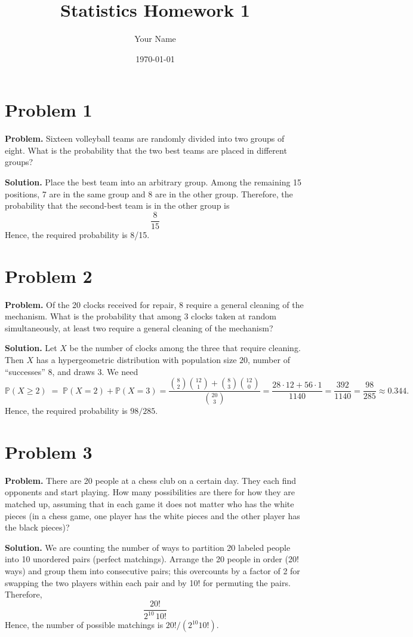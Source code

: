 \documentclass{article}
\title{Statistics Homework 1}
\author{Your Name}
\date{\today}
\begin{document}
\maketitle

\section{Problem 1}

\textbf{Problem.} Sixteen volleyball teams are randomly divided into two groups of eight. What is the probability that the two best teams are placed in different groups?

\textbf{Solution.} Place the best team into an arbitrary group. Among the remaining 15 positions, 7 are in the same group and 8 are in the other group. Therefore, the probability that the second-best team is in the other group is
\[
\frac{8}{15}
\]
Hence, the required probability is 8/15.
\section{Problem 2}

\textbf{Problem.} Of the 20 clocks received for repair, 8 require a general cleaning of the mechanism. What is the probability that among 3 clocks taken at random simultaneously, at least two require a general cleaning of the mechanism?

\textbf{Solution.} Let $X$ be the number of clocks among the three that require cleaning. Then $X$ has a hypergeometric distribution with population size $20$, number of ``successes'' $8$, and draws $3$. We need
\[
\mathbb{P}(X \ge 2) \;=\; \mathbb{P}(X=2) + \mathbb{P}(X=3)
= \frac{\binom{8}{2}\binom{12}{1} + \binom{8}{3}\binom{12}{0}}{\binom{20}{3}}
= \frac{28\cdot 12 + 56\cdot 1}{1140}
= \frac{392}{1140}
= \frac{98}{285}
\approx 0.344.
\]
Hence, the required probability is $98/285$.
\section{Problem 3}

\textbf{Problem.} There are 20 people at a chess club on a certain day. They each find opponents and start playing. How many possibilities are there for how they are matched up, assuming that in each game it does not matter who has the white pieces (in a chess game, one player has the white pieces and the other player has the black pieces)?

\textbf{Solution.} We are counting the number of ways to partition 20 labeled people into 10 unordered pairs (perfect matchings). Arrange the 20 people in order (20! ways) and group them into consecutive pairs; this overcounts by a factor of 2 for swapping the two players within each pair and by 10! for permuting the pairs. Therefore,
\[
\frac{20!}{2^{10}\,10!}
\]
Hence, the number of possible matchings is $20!/(2^{10}10!)$.
\end{document}
